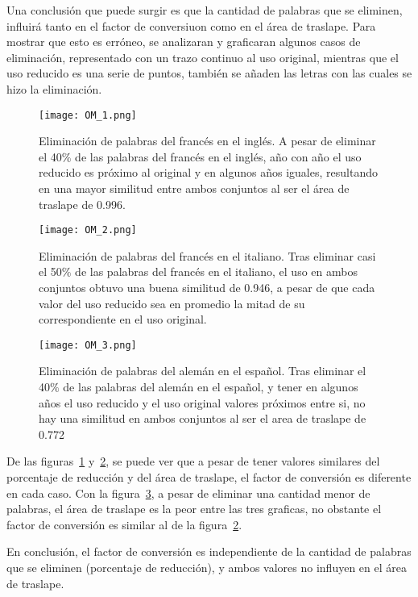 Una conclusión que puede surgir es que la cantidad de palabras que se eliminen, influirá tanto en el factor de conversiuon como en el área de traslape. Para mostrar que esto es erróneo, se analizaran y graficaran algunos casos de eliminación, representado con un  trazo continuo al uso original, mientras que el uso reducido es una serie de puntos, también se añaden las letras con las cuales se hizo la eliminación. %


\begin{figure}[]
	\centering
	\texttt{[image: OM\_1.png]}
	\caption{Eliminación de palabras del francés en el inglés. A pesar de eliminar el 40$\%$ de las palabras del francés en el inglés, año con año el uso reducido es próximo al original y en algunos años iguales, resultando en una mayor similitud  entre ambos conjuntos al ser el área de traslape de 0.996.}
	\label{fig.OM1}
\end{figure}


\begin{figure}[]
	\centering
	\texttt{[image: OM\_2.png]}
	\caption{Eliminación de palabras del francés en el italiano. Tras eliminar casi el 50$\%$ de las palabras del francés en el italiano, el uso en ambos conjuntos obtuvo una buena similitud de 0.946, a pesar de que cada valor del uso reducido sea en promedio la mitad de su correspondiente en el uso original.}
	\label{fig.OM2}
\end{figure}

\begin{figure}[]
	\centering
	\texttt{[image: OM\_3.png]}
	\caption{Eliminación de palabras del alemán en el español. Tras eliminar el 40$\%$ de las palabras del alemán en el español, y  tener en algunos años el uso reducido y el uso original valores próximos entre si, no hay una similitud en ambos conjuntos al ser el area de traslape de 0.772}
	\label{fig.OM3}
\end{figure}


De las figuras~\ref{fig.OM1} y~\ref{fig.OM2}, se puede ver que a pesar de tener valores similares del porcentaje de reducción y del área de traslape, el factor de conversión es diferente en cada caso. Con la figura~\ref{fig.OM3}, a pesar de eliminar una cantidad menor de palabras, el área de traslape es la peor entre las tres graficas, no obstante el factor de conversión es similar al de la figura~\ref{fig.OM2}.

En conclusión, el factor de conversión es independiente de la cantidad de palabras que se eliminen (porcentaje de reducción), y ambos valores no influyen en el área de traslape.


